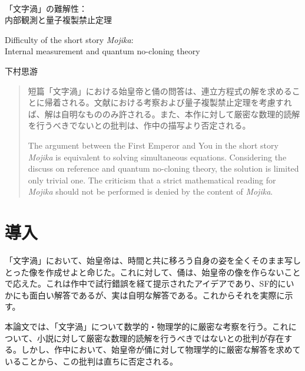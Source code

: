 \documentclass[10pt, a5paper, twoside]{jsarticle}
\theoremstyle{definition}
\begin{document}
	{\Large 　} %

	\begin{center}

		\Large{「文字渦」の難解性： \\ 内部観測と量子複製禁止定理}

		\vspace{3mm}

		\large{Difficulty of the short story \textit{Mojika}: \\ Internal measurement and quantum no-cloning theory}

		\vspace{3mm}
		
		\large{下村思游}

	\end{center}

	\vspace{3mm}

	\begin{abstract}

		短篇「文字渦」における始皇帝と俑の問答は、連立方程式の解を求めることに帰着される。文献\cite{sshimo}における考察および量子複製禁止定理を考慮すれば、解は自明なもののみ許される。また、本作に対して厳密な数理的読解を行うべきでないとの批判は、作中の描写より否定される。

		\vspace{3mm}

		The argument between the First Emperor and You in the short story \textit{Mojika} is equivalent to solving simultaneous equations. Considering the discuss on reference \cite{sshimo} and quantum no-cloning theory, the solution is limited only trivial one. The criticism that a strict mathematical reading for \textit{Mojika} should not be performed is denied by the content of \textit{Mojika}.

	\end{abstract}

	\section{導入}

		「文字渦」において、始皇帝は、時間と共に移ろう自身の姿を全くそのまま写しとった像を作成せよと命じた。これに対して、俑は、始皇帝の像を作らないことで応えた。これは作中で試行錯誤を経て提示されたアイデアであり、SF的にいかにも面白い解答であるが、実は自明な解答である。これからそれを実際に示す。

		本論文では、「文字渦」について数学的・物理学的に厳密な考察を行う。これについて、小説に対して厳密な数理的読解を行うべきではないとの批判が存在する。しかし、作中において、始皇帝が俑に対して物理学的に厳密な解答を求めていることから、この批判は直ちに否定される。
\end{document}
